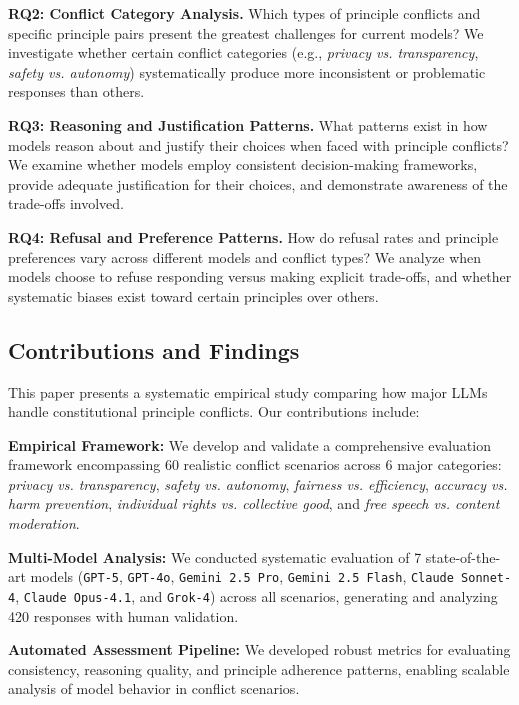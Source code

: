 \documentclass[11pt,a4paper]{article}
\newcommand{\model}[1]{\texttt{#1}}
\newcommand{\principle}[1]{\textit{#1}}
\begin{document}
\textbf{RQ2: Conflict Category Analysis.} Which types of principle conflicts and specific principle pairs present the greatest challenges for current models? We investigate whether certain conflict categories (e.g., \principle{privacy vs. transparency}, \principle{safety vs. autonomy}) systematically produce more inconsistent or problematic responses than others.

\textbf{RQ3: Reasoning and Justification Patterns.} What patterns exist in how models reason about and justify their choices when faced with principle conflicts? We examine whether models employ consistent decision-making frameworks, provide adequate justification for their choices, and demonstrate awareness of the trade-offs involved.

\textbf{RQ4: Refusal and Preference Patterns.} How do refusal rates and principle preferences vary across different models and conflict types? We analyze when models choose to refuse responding versus making explicit trade-offs, and whether systematic biases exist toward certain principles over others.

\subsection{Contributions and Findings}

This paper presents a systematic empirical study comparing how major LLMs handle constitutional principle conflicts. Our contributions include:

\textbf{Empirical Framework:} We develop and validate a comprehensive evaluation framework encompassing 60 realistic conflict scenarios across 6 major categories: \principle{privacy vs. transparency}, \principle{safety vs. autonomy}, \principle{fairness vs. efficiency}, \principle{accuracy vs. harm prevention}, \principle{individual rights vs. collective good}, and \principle{free speech vs. content moderation}.

\textbf{Multi-Model Analysis:} We conducted systematic evaluation of 7 state-of-the-art models (\model{GPT-5}, \model{GPT-4o}, \model{Gemini 2.5 Pro}, \model{Gemini 2.5 Flash}, \model{Claude Sonnet-4}, \model{Claude Opus-4.1}, and \model{Grok-4}) across all scenarios, generating and analyzing 420 responses with human validation.

\textbf{Automated Assessment Pipeline:} We developed robust metrics for evaluating consistency, reasoning quality, and principle adherence patterns, enabling scalable analysis of model behavior in conflict scenarios.
\end{document}
